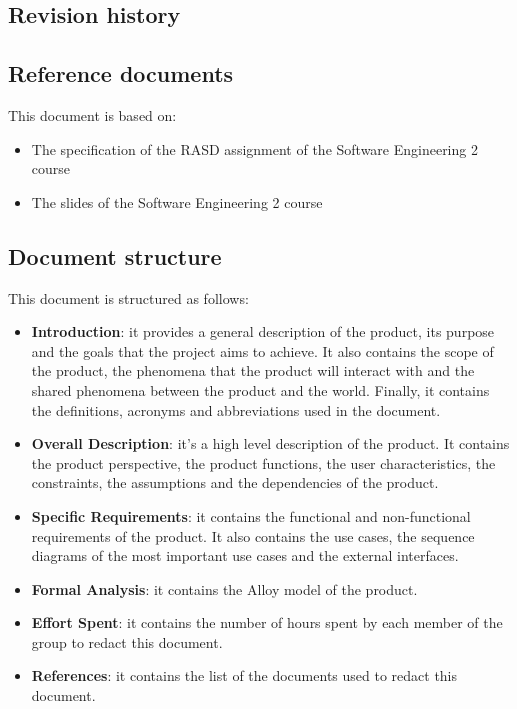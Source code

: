 \subsection{Revision history}

\subsection{Reference documents}
This document is based on:
\begin{itemize}
    \item The specification of the RASD assignment of the Software Engineering 2 course
    \item The slides of the Software Engineering 2 course
\end{itemize}

\subsection{Document structure}
This document is structured as follows:
\begin{itemize}
    \item \textbf{Introduction}: it provides a general description of the product, its purpose and the goals that the project aims to achieve. It also contains the scope of the product, the phenomena that the product will interact with and the shared phenomena between the product and the world. Finally, it contains the definitions, acronyms and abbreviations used in the document.
    \item \textbf{Overall Description}: it's a high level description of the product. It contains the product perspective, the product functions, the user characteristics, the constraints, the assumptions and the dependencies of the product.
    \item \textbf{Specific Requirements}: it contains the functional and non-functional requirements of the product. It also contains the use cases, the sequence diagrams of the most important use cases and the external interfaces.
    \item \textbf{Formal Analysis}: it contains the Alloy model of the product.
    \item \textbf{Effort Spent}: it contains the number of hours spent by each member of the group to redact this document.
    \item \textbf{References}: it contains the list of the documents used to redact this document.
\end{itemize}
